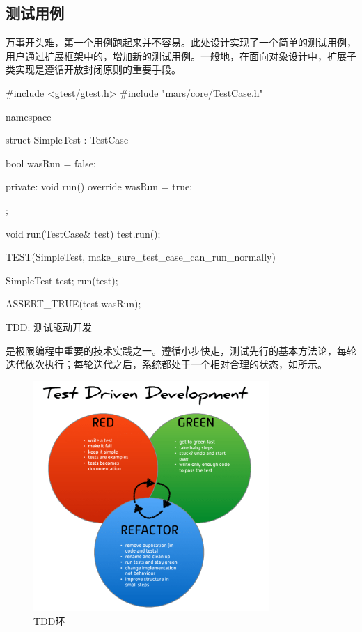 \begin{content}

\subsection{测试用例}

万事开头难，第一个用例跑起来并不容易。此处设计实现了一个简单的测试用例，用户通过扩展框架中的，增加新的测试用例。一般地，在面向对象设计中，扩展子类实现是遵循开放封闭原则的重要手段。

\begin{leftbar}
 \begin{c++}[caption={\ttfamily{test/mars/core/TestCaseSpec.cc}}]
#include <gtest/gtest.h>
#include "mars/core/TestCase.h"

namespace {
  struct SimpleTest : TestCase {
    bool wasRun = false;

  private:
    void run() override {
      wasRun = true;
    }
  };

  void run(TestCase& test) {
    test.run();
  }
}

TEST(SimpleTest, make_sure_test_case_can_run_normally) {
  SimpleTest test;
  run(test);

  ASSERT_TRUE(test.wasRun);
}
 \end{c++}
\end{leftbar}

\begin{episode}{TDD: 测试驱动开发}

\begin{content}

是极限编程中重要的技术实践之一。遵循小步快走，测试先行的基本方法论，每轮迭代依次执行；每轮迭代之后，系统都处于一个相对合理的状态，如所示。

\begin{figure}[H]
\centering
\includegraphics[width=0.8\textwidth]{figures/xunit/tdd_cycle.png}
\caption{TDD环}
 \label{fig:tdd-cycle}
\end{figure}


\end{content}
\end{episode}
\end{content}
